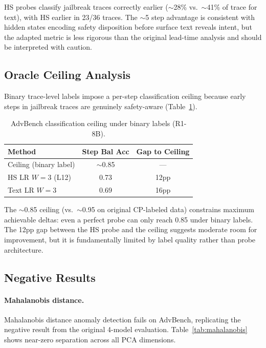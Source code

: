 \documentclass[11pt]{article}
\begin{document}
HS probes classify jailbreak traces correctly earlier ($\sim$28\% vs.\ $\sim$41\% of trace for text), with HS earlier in 23/36 traces. The $\sim$5 step advantage is consistent with hidden states encoding safety disposition before surface text reveals intent, but the adapted metric is less rigorous than the original lead-time analysis and should be interpreted with caution.

\subsection{Oracle Ceiling Analysis}

Binary trace-level labels impose a per-step classification ceiling because early steps in jailbreak traces are genuinely safety-aware (Table~\ref{tab:ceiling}).

\begin{table}[t]
\centering
\small
\caption{AdvBench classification ceiling under binary labels (R1-8B).}
\label{tab:ceiling}
\begin{tabular}{lcc}
\toprule
Method & Step Bal Acc & Gap to Ceiling \\
\midrule
Ceiling (binary label) & $\sim$0.85 & --- \\
HS LR $W{=}3$ (L12) & 0.73 & 12pp \\
Text LR $W{=}3$ & 0.69 & 16pp \\
\bottomrule
\end{tabular}
\end{table}

The $\sim$0.85 ceiling (vs.\ $\sim$0.95 on original CP-labeled data) constrains maximum achievable deltas: even a perfect probe can only reach 0.85 under binary labels. The 12pp gap between the HS probe and the ceiling suggests moderate room for improvement, but it is fundamentally limited by label quality rather than probe architecture.

\subsection{Negative Results}

\paragraph{Mahalanobis distance.} Mahalanobis distance anomaly detection fails on AdvBench, replicating the negative result from the original 4-model evaluation. Table~\ref{tab:mahalanobis} shows near-zero separation across all PCA dimensions.
\end{document}
